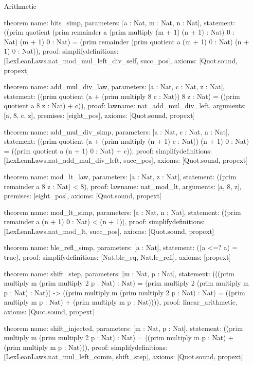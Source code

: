 \begin{lexlean}{Arithmetic}
\begin{semanticmodule}
theorem{
  name: bits_simp,
  parameters: [a : Nat, m : Nat, n : Nat],
  statement: ((prim quotient (prim remainder a (prim multiply (m + 1) (n + 1) : Nat) 0 : Nat) (m + 1) 0 : Nat) = (prim remainder (prim quotient a (m + 1) 0 : Nat) (n + 1) 0 : Nat)),
  proof: simplify{definitions: [LexLeanLaws.nat_mod_mul_left_div_self, succ_pos]},
  axioms: [Quot.sound, propext]
}

theorem{
  name: add_mul_div_law,
  parameters: [a : Nat, c : Nat, z : Nat],
  statement: ((prim quotient (a + (prim multiply 8 c : Nat)) 8 z : Nat) = ((prim quotient a 8 z : Nat) + c)),
  proof: law{name: nat_add_mul_div_left, arguments: [a, 8, c, z], premises: [eight_pos]},
  axioms: [Quot.sound, propext]
}

theorem{
  name: add_mul_div_simp,
  parameters: [a : Nat, c : Nat, n : Nat],
  statement: ((prim quotient (a + (prim multiply (n + 1) c : Nat)) (n + 1) 0 : Nat) = ((prim quotient a (n + 1) 0 : Nat) + c)),
  proof: simplify{definitions: [LexLeanLaws.nat_add_mul_div_left, succ_pos]},
  axioms: [Quot.sound, propext]
}

theorem{
  name: mod_lt_law,
  parameters: [a : Nat, z : Nat],
  statement: ((prim remainder a 8 z : Nat) < 8),
  proof: law{name: nat_mod_lt, arguments: [a, 8, z], premises: [eight_pos]},
  axioms: [Quot.sound, propext]
}

theorem{
  name: mod_lt_simp,
  parameters: [a : Nat, n : Nat],
  statement: ((prim remainder a (n + 1) 0 : Nat) < (n + 1)),
  proof: simplify{definitions: [LexLeanLaws.nat_mod_lt, succ_pos]},
  axioms: [Quot.sound, propext]
}

theorem{
  name: ble_refl_simp,
  parameters: [a : Nat],
  statement: ((a <=? a) = true),
  proof: simplify{definitions: [Nat.ble_eq, Nat.le_refl]},
  axioms: [propext]
}

theorem{
  name: shift_step,
  parameters: [m : Nat, p : Nat],
  statement: (((prim multiply m (prim multiply 2 p : Nat) : Nat) = (prim multiply 2 (prim multiply m p : Nat) : Nat)) -> ((prim multiply m (prim multiply 2 p : Nat) : Nat) = ((prim multiply m p : Nat) + (prim multiply m p : Nat)))),
  proof: linear_arithmetic{},
  axioms: [Quot.sound, propext]
}

theorem{
  name: shift_injected,
  parameters: [m : Nat, p : Nat],
  statement: ((prim multiply m (prim multiply 2 p : Nat) : Nat) = ((prim multiply m p : Nat) + (prim multiply m p : Nat))),
  proof: simplify{definitions: [LexLeanLaws.nat_mul_left_comm, shift_step]},
  axioms: [Quot.sound, propext]
}
\end{semanticmodule}
\end{lexlean}
